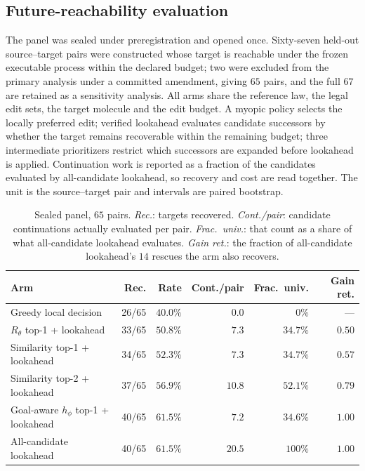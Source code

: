 \subsection{Future-reachability evaluation}
\label{app:exp-lookahead}

The panel was sealed under preregistration and opened once. Sixty-seven held-out source--target pairs were constructed whose target is reachable under the frozen executable process within the declared budget; two were excluded from the primary analysis under a committed amendment, giving $65$ pairs, and the full $67$ are retained as a sensitivity analysis. All arms share the reference law, the legal edit sets, the target molecule and the edit budget. A myopic policy selects the locally preferred edit; verified lookahead evaluates candidate successors by whether the target remains recoverable within the remaining budget; three intermediate prioritizers restrict which successors are expanded before lookahead is applied. Continuation work is reported as a fraction of the candidates evaluated by all-candidate lookahead, so recovery and cost are read together. The unit is the source--target pair and intervals are paired bootstrap.

\begin{table}[h]
\centering
{\small\setlength{\tabcolsep}{4pt}
\begin{tabular}{lrrrrr}
\toprule
Arm & Rec. & Rate & Cont./pair & Frac.\ univ. & Gain ret. \\
\midrule
Greedy local decision            & 26/65 & $40.0\%$ & $0.0$  & $0\%$    & --- \\
$R_\theta$ top-1 + lookahead     & 33/65 & $50.8\%$ & $7.3$  & $34.7\%$ & $0.50$ \\
Similarity top-1 + lookahead     & 34/65 & $52.3\%$ & $7.3$  & $34.7\%$ & $0.57$ \\
Similarity top-2 + lookahead     & 37/65 & $56.9\%$ & $10.8$ & $52.1\%$ & $0.79$ \\
Goal-aware $h_\phi$ top-1 + lookahead & 40/65 & $61.5\%$ & $7.2$ & $34.6\%$ & $1.00$ \\
All-candidate lookahead          & 40/65 & $61.5\%$ & $20.5$ & $100\%$  & $1.00$ \\
\bottomrule
\end{tabular}}
\caption{\small Sealed panel, $65$ pairs. \emph{Rec.}: targets recovered. \emph{Cont./pair}: candidate continuations actually evaluated per pair. \emph{Frac.\ univ.}: that count as a share of what all-candidate lookahead evaluates. \emph{Gain ret.}: the fraction of all-candidate lookahead's $14$ rescues the arm also recovers.}
\label{tab:lookahead-full}
\end{table}

